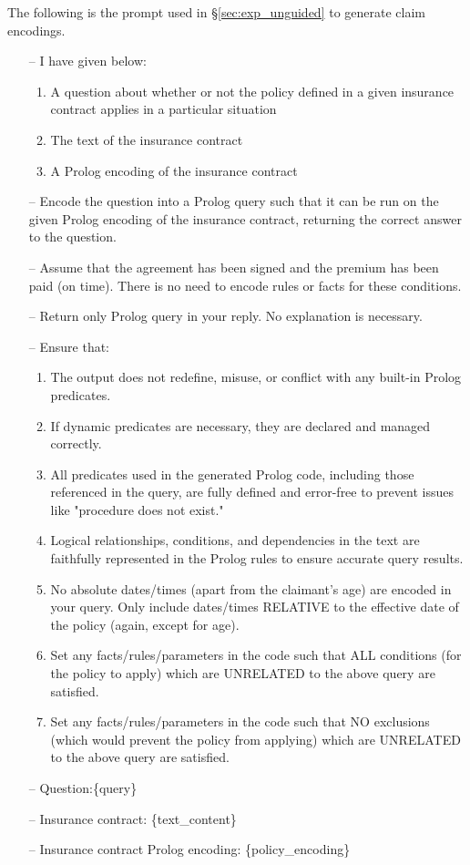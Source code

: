 The following is the prompt used in \S\ref{sec:exp_unguided} to generate claim encodings.

\begin{itemize}
    \item [--] I have given below:
        \begin{enumerate}
            \item A question about whether or not the policy defined in a given insurance contract applies in a particular situation
            \item The text of the insurance contract
            \item A Prolog encoding of the insurance contract
        \end{enumerate}
    \item [--] Encode the question into a Prolog query such that it can be run on the given Prolog encoding of the insurance contract, returning the correct answer to the question.
    \item [--] Assume that the agreement has been signed and the premium has been paid (on time). There is no need to encode rules or facts for these conditions.
    \item [--] Return only Prolog query in your reply. No explanation is necessary.
    \item [--] Ensure that:
        \begin{enumerate}
            \item The output does not redefine, misuse, or conflict with any built-in Prolog predicates.
            \item If dynamic predicates are necessary, they are declared and managed correctly.
            \item All predicates used in the generated Prolog code, including those referenced in the query, are fully defined and error-free to prevent issues like "procedure does not exist."
            \item Logical relationships, conditions, and dependencies in the text are faithfully represented in the Prolog rules to ensure accurate query results.
            \item No absolute dates/times (apart from the claimant's age) are encoded in your query. Only include dates/times RELATIVE to the effective date of the policy (again, except for age).
            \item Set any facts/rules/parameters in the code such that ALL conditions (for the policy to apply) which are UNRELATED to the above query are satisfied.
            \item Set any facts/rules/parameters in the code such that NO exclusions (which would prevent the policy from applying) which are UNRELATED to the above query are satisfied.
        \end{enumerate}
    \item [--] Question:\{query\}
    \item [--] Insurance contract: \{text\_content\}
    \item [--] Insurance contract Prolog encoding: \{policy\_encoding\}
\end{itemize}


